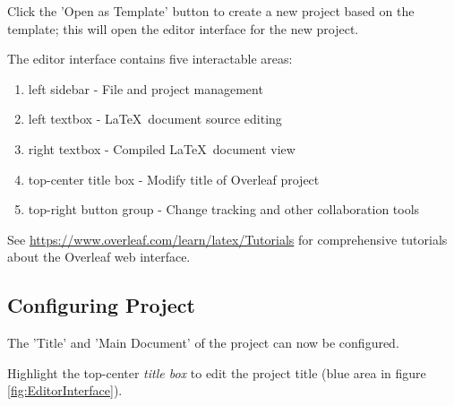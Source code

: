 Click the 'Open as Template' button to create a new project based on the template; this will open the editor interface for the new project.

\begin{minipage}{\linewidth}
\label{fig:EditorInterface}
\end{minipage}

The editor interface contains five interactable areas:
\begin{enumerate}
    \item {} left sidebar - File and project management
    \item {} left textbox - \LaTeX\ document source editing
   \item {} right textbox - Compiled \LaTeX\ document view
    \item {} top-center title box - Modify title of Overleaf project
    \item {} top-right button group - Change tracking and other collaboration tools
\end{enumerate}
See \url{https://www.overleaf.com/learn/latex/Tutorials} for comprehensive tutorials about the Overleaf web interface.

\subsection{Configuring Project}
The 'Title' and 'Main Document' of the project can now be configured.
\par
Highlight the top-center \textit{title box} to edit the project title (blue area in figure \ref{fig:EditorInterface}).

\begin{minipage}{\linewidth}
\end{minipage}

